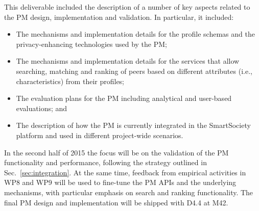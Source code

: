 This deliverable included the description of  a number of key aspects related to the PM design, implementation and validation. 
In particular, it included:
\begin{itemize}
\item The mechanisms and implementation details for the profile schemas and the privacy-enhancing technologies used by the PM;
\item The mechanisms and implementation details for the services that allow searching, matching and ranking of peers based on different attributes (i.e., characteristics) from their profiles;
\item The evaluation plans for the PM including analytical and user-based evaluations; and
\item The description of how the PM is currently integrated in the SmartSociety platform and used in different project-wide scenarios.
\end{itemize}
In the second half of 2015 the focus will be on the validation of the PM functionality and performance, following the strategy outlined in Sec.~\ref{sec:integration}. At the same time, feedback from empirical activities in WP8 and WP9 will be used to fine-tune the PM APIs and the underlying mechanisms, with particular emphasis on search and ranking functionality. The final PM design and implementation will be shipped with D4.4 at M42.
